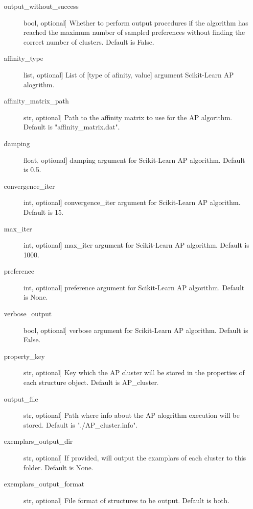 \documentclass[letterpaper,10pt,english]{sphinxmanual}
\begin{document}
\begin{fulllineitems}
\begin{fulllineitems}
\begin{description}
\item[{output\_without\_success}] \leavevmode{[}bool, optional{]}
Whether to perform output procedures if the algorithm has reached
the maximum number of sampled preferences without finding the
correct number of clusters. Default is False.

\item[{affinity\_type}] \leavevmode{[}list, optional{]}
List of {[}type of afinity, value{]} argument Scikit-Learn AP alogrithm.

\item[{affinity\_matrix\_path}] \leavevmode{[}str, optional{]}
Path to the affinity matrix to use for the AP algorithm.
Default is "affinity\_matrix.dat".

\item[{damping}] \leavevmode{[}float, optional{]}
damping argument for Scikit-Learn AP algorithm. Default is 0.5.

\item[{convergence\_iter}] \leavevmode{[}int, optional{]}
convergence\_iter argument for Scikit-Learn AP algorithm.
Default is 15.

\item[{max\_iter}] \leavevmode{[}int, optional{]}
max\_iter argument for Scikit-Learn AP algorithm. Default is 1000.

\item[{preference}] \leavevmode{[}int, optional{]}
preference argument for Scikit-Learn AP algorithm. Default is None.

\item[{verbose\_output}] \leavevmode{[}bool, optional{]}
verbose argument for Scikit-Learn AP algorithm. Default is False.

\item[{property\_key}] \leavevmode{[}str, optional{]}
Key which the AP cluster will be stored in the properties of
each structure object. Default is AP\_cluster.

\item[{output\_file}] \leavevmode{[}str, optional{]}
Path where info about the AP alogrithm execution will be stored.
Default is "./AP\_cluster.info".

\item[{exemplars\_output\_dir}] \leavevmode{[}str, optional{]}
If provided, will output the examplars of each cluster to this
folder. Default is None.

\item[{exemplars\_output\_format}] \leavevmode{[}str, optional{]}
File format of structures to be output. Default is both.


\end{description}
\end{fulllineitems}
\end{fulllineitems}
\end{document}
